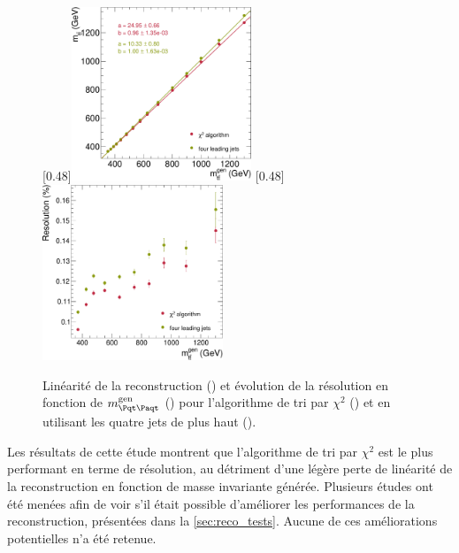 \begin{figure}[tbp] \centering
    \subcaptionbox{\label{fig:mtt_response_chi2_vs_four_jets}}[0.48\textwidth]{\includegraphics[width=0.48\textwidth]{chapitre6/figs/mtt_response_vs_gen_comparison_chi2_four_jets.pdf}}\hfill
    \subcaptionbox{\label{fig:mtt_reso_vs_mtt_gen_chi2_vs_four_jets}}[0.48\textwidth]{\includegraphics[width=0.48\textwidth]{chapitre6/figs/mtt_resolution_vs_gen_comparison_chi2_four_jets.pdf}}
    \caption{Linéarité de la reconstruction () et évolution de la résolution en fonction de $\mtt^\text{gen}$ () pour l'algorithme de tri par $\chi^2$ (\rouge) et en utilisant les quatre jets de plus haut \pt (\vertc).}
    \label{fig:mtt_reso_chi2_vs_four_jets}
\end{figure}

\bigskip

Les résultats de cette étude montrent que l'algorithme de tri par $\chi^2$ est le plus performant en terme de résolution, au détriment d'une légère perte de linéarité de la reconstruction en fonction de masse invariante générée. Plusieurs études ont été menées afin de voir s'il était possible d'améliorer les performances de la reconstruction, présentées dans la \cref{sec:reco_tests}. Aucune de ces améliorations potentielles n'a été retenue.

